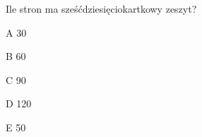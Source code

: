 \begin{tresc}
Ile stron ma sześćdziesięciokartkowy zeszyt?
\end{tresc}
\begin{wariant}{A} 30 \end{wariant}
\begin{wariant}{B} 60 \end{wariant}
\begin{wariant}{C} 90 \end{wariant}
\begin{wariant}{D} 120 \end{wariant}
\begin{wariant}{E} 50 \end{wariant}
